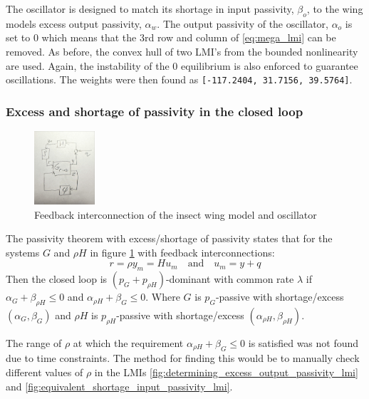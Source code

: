 \documentclass{article}
\begin{document}
The oscillator is designed to match its shortage in input passivity, $\beta_o$, to the wing models excess output passivity, $\alpha_w$.
The output passivity of the oscillator, $\alpha_o$ is set to 0 which means that the 3rd row and column of \ref{eq:mega_lmi} can be removed.
As before, the convex hull of two LMI's from the bounded nonlinearity are used.
Again, the instability of the 0 equilibrium is also enforced to guarantee oscillations.
The weights were then found as \texttt{[-117.2404,   31.7156,   39.5764]}.

\subsubsection{Excess and shortage of passivity in the closed loop }

\begin{figure}[H]
    \centering
    \includegraphics[width=0.2\textwidth]{figures/excess_shortage.jpg}
    \caption{Feedback interconnection of the insect wing model and oscillator}  
    \label{fig:excess_shortage}
\end{figure}

The passivity theorem with excess/shortage of passivity states that for the systems $G$ and $\rho H$ in figure \ref{fig:excess_shortage} with feedback interconnections:
\begin{equation}
    r = \rho y_m = H u_m \quad \text{and} \quad u_m = y + q
\end{equation}
Then the closed loop is $(p_G + p_{\rho H})$-dominant with common rate $\lambda$ if $\alpha_G + \beta_{\rho H} \leq 0$ and $\alpha_{\rho H} + \beta_G \leq 0$.
Where $G$ is $p_G$-passive with shortage/excess $(\alpha_G, \beta_G)$ and $\rho H$ is $p_{\rho H}$-passive with shortage/excess $(\alpha_{\rho H}, \beta_{\rho H})$.

The range of $\rho$ at which the requirement $\alpha_{\rho H} + \beta_G \leq 0$ is satisfied was not found due to time constraints.
The method for finding this would be to manually check different values of $\rho$ in the LMIs \ref{fig:determining_excess_output_passivity_lmi} and \ref{fig:equivalent_shortage_input_passivity_lmi}.
\end{document}
